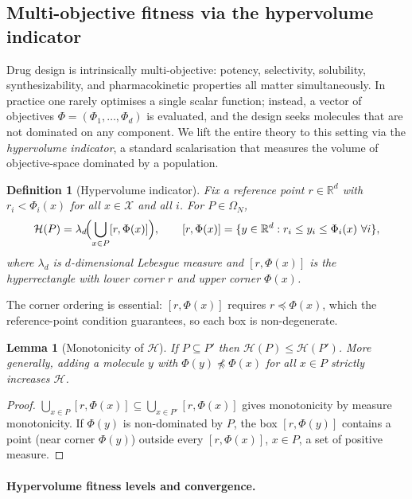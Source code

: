 \documentclass[11pt,a4paper]{article}
\newtheorem{lemma}[theorem]{Lemma}
\newtheorem{definition}[theorem]{Definition}
\newcommand{\X}{\mathcal{X}}
\newcommand{\Omn}{\Omega_N}
\newcommand{\R}{\mathbb{R}}
\begin{document}
\subsection{Multi-objective fitness via the hypervolume indicator}
\label{sec:multiobjective}

Drug design is intrinsically multi-objective: potency, selectivity,
solubility, synthesizability, and pharmacokinetic properties all matter
simultaneously.  In practice one rarely optimises a single scalar
function; instead, a vector of objectives $\Phi=(\Phi_1,\dots,\Phi_d)$ is
evaluated, and the design seeks molecules that are not dominated on any
component.  We lift the entire theory to this setting via the
\emph{hypervolume indicator}, a standard scalarisation that measures the
volume of objective-space dominated by a population.

\begin{definition}[Hypervolume indicator]\label{def:hv}
  Fix a reference point $r\in\R^d$ with $r_i<\Phi_i(x)$ for all $x\in\X$
  and all $i$.  For $P\in\Omn$,
  \[
    \mathcal{H}(P)=\lambda_d\!\Bigl(\bigcup_{x\in P}[r,\Phi(x)]\Bigr),
    \qquad
    [r,\Phi(x)]=\{y\in\R^d:r_i\le y_i\le\Phi_i(x)\ \forall i\},
  \]
  where $\lambda_d$ is $d$-dimensional Lebesgue measure and $[r,\Phi(x)]$
  is the hyperrectangle with lower corner $r$ and upper corner
  $\Phi(x)$.
\end{definition}

The corner ordering is essential: $[r,\Phi(x)]$ requires $r\preceq
\Phi(x)$, which the reference-point condition guarantees, so each box is
non-degenerate.

\begin{lemma}[Monotonicity of $\mathcal H$]\label{lem:hv-mono}
  If $P\subseteq P'$ then $\mathcal H(P)\le\mathcal H(P')$.  More
  generally, adding a molecule $y$ with $\Phi(y)\not\preceq\Phi(x)$ for
  all $x\in P$ strictly increases $\mathcal H$.
\end{lemma}

\begin{proof}
  $\bigcup_{x\in P}[r,\Phi(x)]\subseteq\bigcup_{x\in P'}[r,\Phi(x)]$ gives
  monotonicity by measure monotonicity.  If $\Phi(y)$ is non-dominated
  by $P$, the box $[r,\Phi(y)]$ contains a point (near corner $\Phi(y)$)
  outside every $[r,\Phi(x)]$, $x\in P$, a set of positive measure.
\end{proof}

\paragraph{Hypervolume fitness levels and convergence.}
\end{document}
